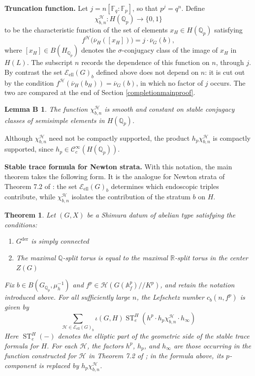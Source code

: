 \documentclass[11pt,a4paper]{article}
\newcommand{\Eell}{\mathcal{E}_{\mathrm{ell}}}
\theoremstyle{definition}
\theoremstyle{plain}
\theoremstyle{remark}
\theoremstyle{plain}
\newtheorem*{LemB}{Lemma B}
\newtheorem*{T}{Theorem}
\DeclareMathOperator{\ST}{ST}
\begin{document}
\textbf{Truncation function.} Let $j=n[\mathbb{F}_q:\mathbb{F}_p]$, so that $p^j=q^n$. Define
$$
\chi_{b,n}^{\mathcal H}:H(\mathbb Q_p)\longrightarrow\{0,1\}
$$
to be the characteristic function of the set of elements $x_H\in H(\mathbb Q_p)$ satisfying
$$
f^{\mathcal H}\bigl(\overline{\nu}_H([x_H])\bigr)=j\cdot\overline{\nu}_G(b),
$$
where $[x_H]\in B(H_{\mathbb Q_p})$ denotes the $\sigma$-conjugacy class of the image of $x_H$ in $H(L)$. The subscript $n$ records the dependence of this function on $n$, through $j$. By contrast the set $\Eell(G)_b$ defined above does not depend on $n$: it is cut out by the condition $f^{\mathcal H}(\overline{\nu}_H(b_H))=\overline{\nu}_G(b)$, in which no factor of $j$ occurs. The two are compared at the end of Section \ref{completionmainproof}.

\begin{LemB}
    The function $\chi_{b,n}^{\mathcal{H}}$ is smooth and constant on stable conjugacy classes of semisimple elements in $H(\mathbb{Q}_p)$.
\end{LemB}

Although $\chi_{b,n}^{\mathcal{H}}$ need not be compactly supported, the product $h_p\chi_{b,n}^{\mathcal{H}}$ is compactly supported, since $h_p\in\mathcal{C}^{\infty}_c(H(\mathbb{Q}_p))$.

\textbf{Stable trace formula for Newton strata.}
With this notation, the main theorem takes the following form. It is the analogue for Newton strata of Theorem 7.2 of \cite{MR1044820}: the set $\Eell(G)_b$ determines which endoscopic triples contribute, while $\chi_{b,n}^{\mathcal H}$ isolates the contribution of the stratum $b$ on $H$.

\begin{T}
    Let $(G,X)$ be a Shimura datum of abelian type satisfying the conditions:
    \begin{enumerate}
        \item $G^{\text{der}}$ is simply connected
        \item The maximal $\mathbb{Q}$-split torus is equal to the maximal $\mathbb{R}$-split torus in the center $Z(G)$
    \end{enumerate}
    Fix $b\in B(G_{\mathbb Q_p},\mu_h^{-1})$ and $f^p\in\mathcal H(G(\mathbb A_f^p)//K^p)$, and retain the notation introduced above. For all sufficiently large $n$, the Lefschetz number $c_b(n, f^p)$ is given by
    \begin{equation*}
		\sum_{\mathcal{H} \in \Eell(G)_b} \iota (G,H) \ST_e^H(h^p \cdot h_p \chi_{b,n}^{\mathcal{H}} \cdot h_{\infty})
	\end{equation*}
    Here $\ST_e^H(-)$ denotes the elliptic part of the geometric side of the stable trace formula for $H$. For each $\mathcal H$, the factors $h^p$, $h_p$, and $h_\infty$ are those occurring in the function constructed for $\mathcal H$ in Theorem 7.2 of \cite{MR1044820}; in the formula above, its $p$-component is replaced by $h_p\chi_{b,n}^{\mathcal H}$.
\end{T}
\end{document}
